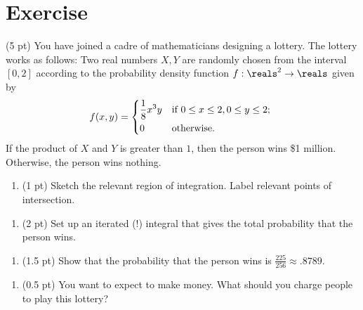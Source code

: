 \section{Exercise}

(5 pt) You have joined a cadre of mathematicians designing a lottery. The lottery works as follows: Two real numbers $X,Y$ are randomly chosen from the interval $[0,2]$ according to the probability density function $f: \reals^{2} \rightarrow \reals$ given by
\begin{align*}
f(x,y)
=
\begin{dcases*}
\frac{1}{8} x^{3} y	&	if $0 \leq x \leq 2,0 \leq y \leq 2$;	\\
0	&	otherwise.
\end{dcases*}
\end{align*}
If the product of $X$ and $Y$ is greater than $1$, then the person wins \$1 million. Otherwise, the person wins nothing.
\begin{enumerate}[label=(\alph*)]
\item (1 pt) Sketch the relevant region of integration. Label relevant points of intersection.
\end{enumerate}

\spaceSolution{1.25in}{%
}%



\begin{enumerate}[resume,label=(\alph*)]
\item (2 pt) Set up an iterated (!) integral that gives the total probability that the person wins.
\end{enumerate}

\spaceSolution{.5in}{%
}%



\begin{enumerate}[resume,label=(\alph*)]
\item (1.5 pt) Show that the probability that the person wins is $\frac{225}{256} \approx .8789$. 
\end{enumerate}

\spaceSolution{3in}{%
}%



\begin{enumerate}[resume,label=(\alph*)]
\item (0.5 pt) You want to expect to make money. What should you charge people to play this lottery?
\end{enumerate}

\spaceSolution{.25in}{%
}%